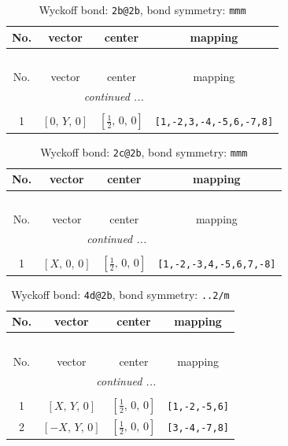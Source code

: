 \documentclass[fleqn,8pt]{jsarticle}
\begin{document}
\begin{longtable}{cccc}
\caption{Wyckoff bond: {\tt 2b@2b}, bond symmetry: {\tt mmm}}
 \\
 \hline \hline
No. & vector & center & mapping \\ \hline \endfirsthead

\multicolumn{3}{l}{\tablename\ \thetable{}} \\
 \hline \hline
No. & vector & center & mapping \\ \hline \endhead

 \hline \hline
\multicolumn{3}{r}{\footnotesize\it continued ...} \\ \endfoot

 \hline \hline
\multicolumn{3}{r}{} \\ \endlastfoot

1 & $\left[ 0,\, Y,\, 0 \right]$ & $\left[ \frac{1}{2},\, 0,\, 0 \right]$ & {\tt [1,-2,3,-4,-5,6,-7,8]} \\
\end{longtable}
\renewcommand{\arraystretch}{1.2}
\begin{longtable}{cccc}
\caption{Wyckoff bond: {\tt 2c@2b}, bond symmetry: {\tt mmm}}
 \\
 \hline \hline
No. & vector & center & mapping \\ \hline \endfirsthead

\multicolumn{3}{l}{\tablename\ \thetable{}} \\
 \hline \hline
No. & vector & center & mapping \\ \hline \endhead

 \hline \hline
\multicolumn{3}{r}{\footnotesize\it continued ...} \\ \endfoot

 \hline \hline
\multicolumn{3}{r}{} \\ \endlastfoot

1 & $\left[ X,\, 0,\, 0 \right]$ & $\left[ \frac{1}{2},\, 0,\, 0 \right]$ & {\tt [1,-2,-3,4,-5,6,7,-8]} \\
\end{longtable}
\renewcommand{\arraystretch}{1.2}
\begin{longtable}{cccc}
\caption{Wyckoff bond: {\tt 4d@2b}, bond symmetry: {\tt ..2/m}}
 \\
 \hline \hline
No. & vector & center & mapping \\ \hline \endfirsthead

\multicolumn{3}{l}{\tablename\ \thetable{}} \\
 \hline \hline
No. & vector & center & mapping \\ \hline \endhead

 \hline \hline
\multicolumn{3}{r}{\footnotesize\it continued ...} \\ \endfoot

 \hline \hline
\multicolumn{3}{r}{} \\ \endlastfoot

1 & $\left[ X,\, Y,\, 0 \right]$ & $\left[ \frac{1}{2},\, 0,\, 0 \right]$ & {\tt [1,-2,-5,6]} \\ \hline
2 & $\left[ - X,\, Y,\, 0 \right]$ & $\left[ \frac{1}{2},\, 0,\, 0 \right]$ & {\tt [3,-4,-7,8]} \\
\end{longtable}
\end{document}
